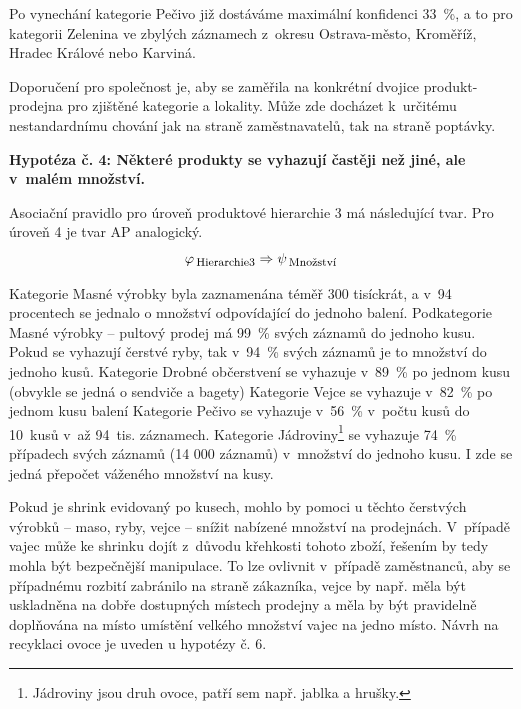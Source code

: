 Po vynechání kategorie Pečivo již dostáváme maximální konfidenci 33~\%, a to pro kategorii Zelenina ve zbylých záznamech z~okresu Ostrava-město, Kroměříž, Hradec Králové nebo Karviná.

Doporučení pro společnost je, aby se zaměřila na konkrétní dvojice produkt-prodejna pro zjištěné kategorie a lokality. Může zde docházet k~určitému nestandardnímu chování jak na straně zaměstnavatelů, tak na straně poptávky.

\vspace*{1em}




\textbf{Hypotéza č. 4: Některé produkty se vyhazují častěji než jiné, ale v~malém množství.}

Asociační pravidlo pro úroveň produktové hierarchie 3 má následující tvar. Pro úroveň 4 je tvar AP analogický.
\begin{equation}
    \varphi_{\mbox{\,\footnotesize Hierarchie3}} \Rightarrow \psi_{\mbox{\,\footnotesize Množství}}
\end{equation}

Kategorie Masné výrobky byla zaznamenána téměř 300 tisíckrát, a v~94 procentech se jednalo o množství odpovídající do jednoho balení. Podkategorie Masné výrobky -- pultový prodej má 99~\% svých záznamů do jednoho kusu.
Pokud se vyhazují čerstvé ryby, tak v~94~\% svých záznamů je to množství do jednoho kusů. Kategorie Drobné občerstvení %
 se vyhazuje v~89~\% po jednom kusu (obvykle se jedná o sendviče a bagety)
Kategorie Vejce se vyhazuje v~82~\% po jednom kusu balení
Kategorie Pečivo se vyhazuje v~56~\% v~počtu kusů do 10~kusů v~až 94~tis. záznamech.
Kategorie Jádroviny\footnote{Jádroviny jsou druh ovoce, patří sem např. jablka a hrušky.} se vyhazuje 74~\% případech svých záznamů (14 000 záznamů) v~množství do jednoho kusu. I zde se jedná přepočet váženého množství na kusy.

Pokud je shrink evidovaný po kusech, mohlo by pomoci u těchto čerstvých výrobků -- maso, ryby, vejce -- snížit nabízené množství na prodejnách. V~případě vajec může ke shrinku dojít z~důvodu křehkosti tohoto zboží, řešením by tedy mohla být bezpečnější manipulace. To lze ovlivnit v~případě zaměstnanců, aby se případnému rozbití zabránilo na straně zákazníka, vejce by např. měla být uskladněna na dobře dostupných místech prodejny a měla by být pravidelně doplňována na místo umístění velkého množství vajec na jedno místo. Návrh na recyklaci ovoce je uveden u hypotézy č. 6.

